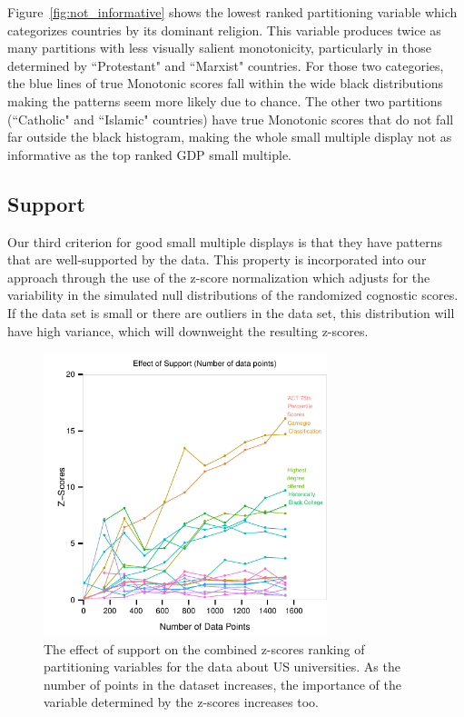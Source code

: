 Figure~\ref{fig:not_informative} shows the lowest ranked partitioning variable which categorizes countries by its dominant religion. This variable produces twice as many partitions with less visually salient monotonicity, particularly in those determined by ``Protestant" and ``Marxist" countries. For those two categories, the blue lines of true Monotonic scores fall within the wide black distributions making the patterns seem more likely due to chance. The other two partitions (``Catholic" and ``Islamic" countries) have true Monotonic scores that do not fall far outside the black histogram, making the whole small multiple display not as informative as the top ranked GDP small multiple.


\subsection{Support}
Our third criterion for good small multiple displays is that they have patterns that are well-supported by the data. This property is incorporated into our approach through the use of the z-score normalization which adjusts for the variability in the simulated null distributions of the randomized cognostic scores. If the data set is small or there are outliers in the data set, this distribution will have high variance, which will downweight the resulting z-scores.

\begin{figure}
\centering
\includegraphics[width=3.25in,height=3.25in]{images/support-nogrid.pdf}
  \caption{The effect of support on the combined z-scores ranking of partitioning variables for the data about US universities. As the number of points in the dataset increases, the importance of the variable determined by the z-scores increases too. }
 \label{fig:support}
\end{figure}

